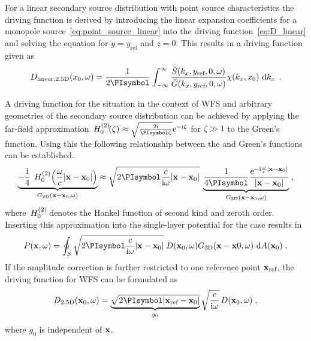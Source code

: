 For a linear secondary source distribution with point source characteristics the
\twohalfD driving function is derived by introducing the
linear expansion coefficients for a monopole
source~\eqref{eq:point_source_linear} into the driving
function~\eqref{eq:D_linear} and solving the equation for $y = y_\text{ref}$ and
$z = 0$. This results in a \twohalfD driving function given
as\autocite[][(3.77)]{Ahrens2012}
%
\begin{equation}
    D_{\text{linear},\twohalfD}(x_0,\omega) = \frac{1}{2\PI} \int_{-\infty}^\infty
    \frac{\breve{S}(k_x,y_\text{ref},0,\omega)}
    {\breve{G}(k_x,y_\text{ref},0,\omega)} \chi(k_x,x_0) \, \D{k_x} \qp
    \label{eq:D_linear_25D}
\end{equation}
%

A driving function for the \twohalfD situation in the context of \ac{WFS}
and arbitrary \twoD geometries of the secondary source distribution
can be achieved by applying the
far-field approximation\autocite[][(4.23)]{Williams1999}
$\H{0}{2}(\zeta) \approx \sqrt{\frac{2\I}{\PI \zeta}}
\E^{-\I\zeta}$ for $\zeta \gg 1$ to the \twoD Green's function.
Using this the
following relationship between the \twoD and \threeD
Green's functions can be established.
%
\begin{multline} 
    \underbrace{
    -\frac{\I}{4} \;\H{0}{2}\left(\omegac |\x-\x_0|\right)
    }_{G_\twoD(\x-\x_0,\omega)}
    \approx
    \sqrt{2\PI \frac{c}{\I\omega} |\x-\x_0|} \;
    \underbrace{
        \frac{1}{4 \PI} \frac{\E^{-\I\omegac|\x-\x_0|}}{|\x-\x_0|}
    }_{G_\threeD(\x-\x_0,\omega)} \qc
    \label{eq:25D_approximation}
\end{multline}
%
where $\,H_{0}^{(2)}\!$ denotes the Hankel function of second kind and zeroth
order.
Inserting this approximation into the single-layer potential for the \twoD
case results in
%
\begin{equation}
    P(\x,\omega) = \oint_S \sqrt{2\PI \frac{c}{\I\omega} |\x-\x_0|} \;
    D(\x_0,\omega) G_\threeD(\x-\x0,\omega) \, \D A(\x_0) \qp
    \label{eq:single:layer_25D}
\end{equation}
%
If the amplitude correction is further restricted to one reference point
$\mathbf{x}_\text{ref}$, the \twohalfD driving function for \ac{WFS} can be formulated
as
%
\begin{equation}
    D_\twohalfD(\x_0,\omega) = \underbrace{\sqrt{2\PI |\x_\text{ref}-\x_0|}}_{g_0}
    \sqrt{\frac{c}{\I\omega}} \,
    D(\x_0,\omega) \qc
    \label{eq:D25D_wfs}
\end{equation}
%
where $g_0$ is independent of $\mathbf{x}$.

